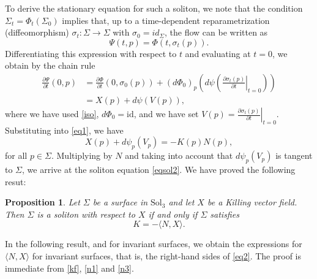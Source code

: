 \documentclass[a4paper,12pt]{amsart}
\theoremstyle{plain}
\newtheorem{proposition}[theorem]{Proposition}
\theoremstyle{definition}
\def\sol{\text{Sol}_3}
\begin{document}
To derive the stationary equation for such a soliton, we note that the condition $\Sigma_t = \Phi_t(\Sigma_0)$ implies that, up to a time-dependent reparametrization (diffeomorphism) $\sigma_t: \Sigma \to \Sigma$ with $\sigma_0 = id_\Sigma$, the flow can be written as
\begin{equation*}
\Psi(t, p) = \Phi(t, \sigma_t(p)).
\end{equation*}
Differentiating this expression with respect to $t$ and evaluating at $t=0$, we obtain by the chain rule
\begin{equation*}
\begin{split}
\frac{\partial \Psi}{\partial t}(0, p) &= \frac{\partial \Phi}{\partial t}(0, \sigma_0(p)) + (d\Phi_0)_p \left( d\psi \left( \left. \frac{\partial \sigma_t(p)}{\partial t} \right|_{t=0} \right) \right)\\
&=X(p) + d\psi ( V(p) ),
\end{split}
\end{equation*}
where we have used \eqref{iso}, $d\Phi_0 = \mbox{id}$, and we have set $V(p)= \left. \frac{\partial \sigma_t(p)}{\partial t} \right|_{t=0} $.
 Substituting into \eqref{eq1}, we have
$$
X (p)+ d\psi_p(V_p)= -K(p)N(p),
$$
for all $p\in\Sigma$. 
Multiplying by $N$ and taking into account that $d\psi_p(V_p)$ is tangent to $\Sigma$, we arrive at the soliton equation \eqref{eqsol2}. We have proved the following resut: 

\begin{proposition} Let $\Sigma$ be a surface in $\sol$ and let $X$ be a Killing vector field. Then $\Sigma$ is a soliton with respect to $X$ if and only if $\Sigma$ satisfies
\begin{equation}\label{eq2}
K=-\langle N,X\rangle .
\end{equation}
\end{proposition}
 
 
In the following result, and for invariant surfaces, we obtain the expressions for $\langle N,X\rangle$ for invariant surfaces, that is, the right-hand sides of \eqref{eq2}. The proof is immediate from \eqref{kf}, \eqref{n1} and \eqref{n3}.
\end{document}

